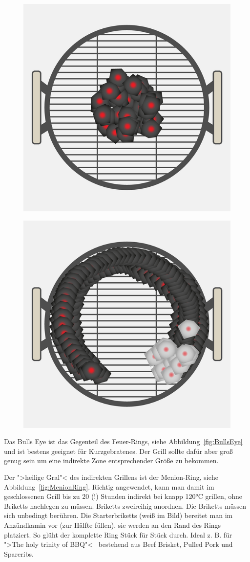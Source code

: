 \begin{figure}[htbp]
	\centering
	\begin{minipage}{.5\textwidth}
		\centering
		\includegraphics[width=.5\linewidth]{pics/BullsEye}
		\label{fig:BullsEye}
	\end{minipage}%
	\begin{minipage}{.5\textwidth}
		\centering
		\includegraphics[width=.5\linewidth]{pics/MenionRIng}
		\label{fig:MenionRing}
	\end{minipage}%
\end{figure}

	Das Bulls Eye ist das Gegenteil des Feuer-Rings, siehe 
	Abbildung~\vref{fig:BullsEye} und ist bestens geeignet für 
	Kurzgebratenes. Der Grill
	sollte dafür aber groß genug sein um eine indirekte Zone entsprechender 
	Größe zu bekommen.
	
	Der ">heilige Gral"< des indirekten Grillens ist der Menion-Ring, siehe 
	Abbildung~\vref{fig:MenionRing}. Richtig angewendet, 
	kann man damit
	im geschlossenen Grill bis zu 20 (!) Stunden indirekt bei knapp 120°C grillen, 
	ohne Briketts nachlegen zu müssen. Briketts 
	zweireihig anordnen. 
	Die Briketts müssen sich unbedingt berühren. Die Starterbriketts (weiß im Bild) 
	bereitet man im Anzündkamin vor (zur Hälfte 
	füllen), sie werden
	an den Rand des Rings platziert. So glüht der komplette Ring Stück für Stück 
	durch. Ideal z. B. für ">The holy trinity of BBQ"< 
	\ bestehend aus 
	Beef Brisket, Pulled Pork und Spareribs.

